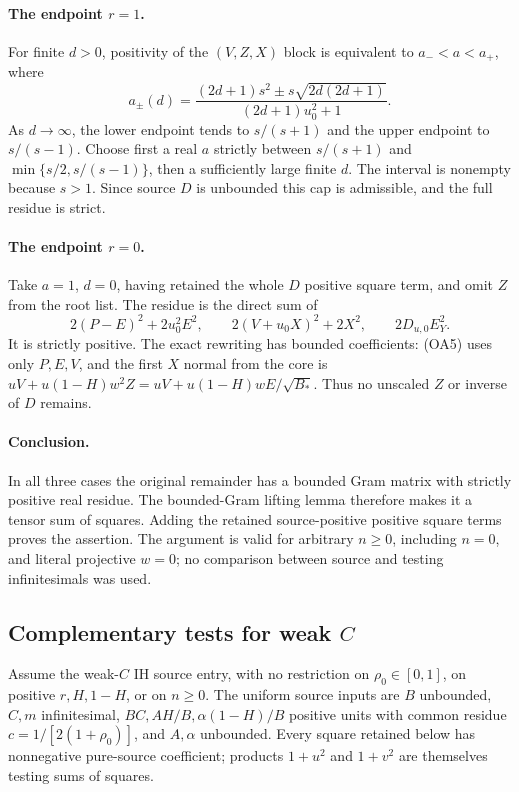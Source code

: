 \paragraph{The endpoint $r=1$.}
For finite $d>0$, positivity of the $(V,Z,X)$ block is equivalent to
$a_-<a<a_+$, where
\[
 a_\pm(d)=
 \frac{(2d+1)s^2\pm s\sqrt{2d(2d+1)}}{(2d+1)u_0^2+1}.
\]
As $d\to\infty$, the lower endpoint tends to $s/(s+1)$ and the upper
endpoint to $s/(s-1)$.  Choose first a real $a$ strictly between
$s/(s+1)$ and $\min\{s/2,s/(s-1)\}$, then a sufficiently large finite
$d$.  The interval is nonempty because $s>1$.  Since source $D$ is
unbounded this cap is admissible, and the full residue is strict.

\paragraph{The endpoint $r=0$.}
Take $a=1$, $d=0$, having retained the whole $D$ positive square term, and omit
$Z$ from the root list. The residue is the direct sum of
\[
 2(P-E)^2+2u_0^2E^2,
 \qquad 2(V+u_0X)^2+2X^2,
 \qquad 2D_{u,0}E_Y^2.
\tag{OA9}
\]
It is strictly positive. The exact rewriting has bounded coefficients:
(OA5) uses only $P,E,V$, and the first $X$ normal from the core is
$uV+u(1-H)w^2Z=uV+u(1-H)wE/\sqrt{B_*}$.
Thus no unscaled $Z$ or inverse of $D$ remains.

\paragraph{Conclusion.}
In all three cases the original remainder has a bounded Gram matrix with
strictly positive real residue.  The bounded-Gram lifting lemma therefore
makes it a tensor sum of squares.  Adding the retained source-positive
positive square terms proves the assertion.  The argument is valid for arbitrary $n\geq0$,
including $n=0$, and literal projective $w=0$; no comparison between source
and testing infinitesimals was used.

\subsection{Complementary tests for weak $C$}
\label{component:p0fb32cd2f1bc}

\label{p0fb32cd2f1bc:sec:weak-ih-remote}
Assume the weak-$C$ IH source entry, with no restriction on
$\rho_0\in[0,1]$, on positive $r,H,1-H$, or on $n\ge0$.
The uniform source inputs are $B$ unbounded, $C,m$ infinitesimal,
$BC,AH/B,\alpha(1-H)/B$ positive units with common residue
$c=1/[2(1+\rho_0)]$, and $A,\alpha$ unbounded.
Every square retained below has nonnegative pure-source coefficient;
products $1+u^2$ and $1+v^2$ are themselves testing sums of squares.

